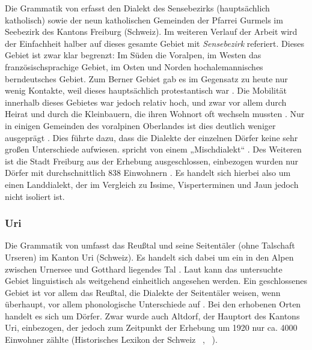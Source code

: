 Die Grammatik von \citet{Henzen1927} erfasst den Dialekt des Sensebezirks (hauptsächlich katholisch) sowie der neun katholischen Gemeinden der Pfarrei Gurmels im Seebezirk des Kantons Freiburg (Schweiz). Im weiteren Verlauf der Arbeit wird der Einfachheit halber auf dieses gesamte Gebiet mit \textit{Sensebezirk} referiert. Dieses Gebiet ist zwar klar begrenzt: Im Süden die Voralpen, im Westen das französischsprachige Gebiet, im Osten und Norden hochalemannisches berndeutsches Gebiet. Zum Berner Gebiet gab es im Gegensatz zu heute nur wenig Kontakte, weil dieses hauptsächlich protestantisch war \citep[2]{Henzen1927}. Die Mobilität innerhalb dieses Gebietes war jedoch relativ hoch, und zwar vor allem durch Heirat und durch die Kleinbauern, die ihren Wohnort oft wechseln mussten \citep[9]{Henzen1927}. Nur in einigen Gemeinden des voralpinen Oberlandes ist dies deutlich weniger ausgeprägt \citep[8--9]{Henzen1927}. Dies führte dazu, dass die Dialekte der einzelnen Dörfer keine sehr großen Unterschiede aufwiesen. \citet{Henzen1927} spricht von einem „Mischdialekt“ \citep[1]{Henzen1927}. Des Weiteren ist die Stadt Freiburg aus der Erhebung ausgeschlossen, einbezogen wurden nur Dörfer mit durchschnittlich 838 Einwohnern \citep[8]{Henzen1927}. Es handelt sich hierbei also um einen Landdialekt, der im Vergleich zu Issime, Visperterminen und Jaun jedoch nicht isoliert ist.

\subsubsection{Uri}\largerpage

Die Grammatik von \citet{Clauß1929} umfasst das Reußtal und seine Seitentäler (ohne Talschaft Urseren) im Kanton Uri (Schweiz). Es handelt sich dabei um ein in den Alpen zwischen Urnersee und Gotthard liegendes Tal \citep[1]{Clauß1929}. Laut \citet{Clauß1929} kann das untersuchte Gebiet linguistisch als weitgehend einheitlich angesehen werden. Ein geschlossenes Gebiet ist vor allem das Reußtal, die Dialekte der Seitentäler weisen, wenn überhaupt, vor allem phonologische Unterschiede auf \citep[11--12]{Clauß1929}. Bei den erhobenen Orten handelt es sich um Dörfer. Zwar wurde auch Altdorf, der Hauptort des Kantons Uri, einbezogen, der jedoch zum Zeitpunkt der Erhebung um 1920 nur ca. 4000 Einwohner zählte (Historisches Lexikon der Schweiz ~\citeyear{LexA2011}, ~).

